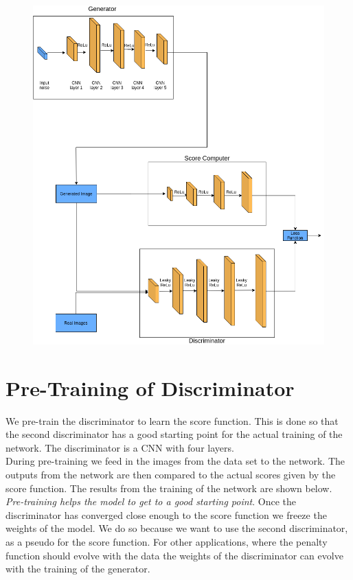 \documentclass[12pt]{report}
\begin{document}
\begin{figure}[H]
	\centering
	\includegraphics[scale=0.4]{RegGAN}
\end{figure} 

\section*{Pre-Training of Discriminator}

We pre-train the discriminator to learn the score function. This is done so that the second discriminator has a good starting point for the actual training of the network. The discriminator is a CNN with four layers. 
\\
During pre-training we feed in the images from the data set to the network. The outputs from the network are then compared to the actual scores given by the score function. The results from the training of the network are shown below. \emph{Pre-training helps the model to get to a good starting point}. Once the discriminator has converged close enough to the score function we freeze the weights of the model. We do so because we want to use the second discriminator, as a pseudo for the score function. For other applications, where the penalty function should evolve with the data the weights of the discriminator can evolve with the training of the generator.
\end{document}
